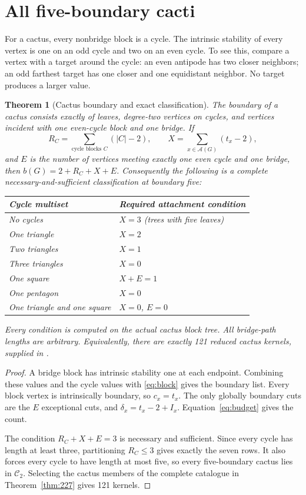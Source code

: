 \documentclass[11pt,a4paper]{article}
\newtheorem{theorem}{Theorem}[section]
\theoremstyle{definition}\newtheorem{definition}[theorem]{Definition}
\theoremstyle{remark}\newtheorem{remark}[theorem]{Remark}
\newcommand{\cuts}{\mathcal A}
\begin{document}
\section{All five-boundary cacti}
For a cactus, every nonbridge block is a cycle. The intrinsic stability of every
vertex is one on an odd cycle and two on an even cycle. To see this, compare a
vertex with a target around the cycle: an even antipode has two closer
neighbors; an odd farthest target has one closer and one equidistant neighbor.
No target produces a larger value.

\begin{theorem}[Cactus boundary and exact classification]\label{thm:cactus}
The boundary of a cactus consists exactly of leaves, degree-two vertices on
cycles, and vertices incident with one even-cycle block and one bridge.
If
\[
 R_C=\sum_{\text{cycle blocks }C}(|C|-2),\qquad
 X=\sum_{x\in\cuts(G)}(t_x-2),
\]
and $E$ is the number of vertices meeting exactly one even cycle and one bridge,
then $b(G)=2+R_C+X+E$. Consequently the following is a complete
necessary-and-sufficient classification at boundary five:
\begin{center}
\begin{tabular}{@{}ll@{}}\toprule
Cycle multiset & Required attachment condition\\\midrule
No cycles & $X=3$ (trees with five leaves)\\
One triangle & $X=2$\\
Two triangles & $X=1$\\
Three triangles & $X=0$\\
One square & $X+E=1$\\
One pentagon & $X=0$\\
One triangle and one square & $X=0$, $E=0$\\\bottomrule
\end{tabular}
\end{center}
Every condition is computed on the actual cactus block tree. All bridge-path
lengths are arbitrary. Equivalently, there are exactly 121 reduced cactus
kernels, supplied in .
\end{theorem}
\begin{proof}
A bridge block has intrinsic stability one at each endpoint. Combining these
values and the cycle values with \eqref{eq:block} gives the boundary list.
Every block vertex is intrinsically boundary, so $c_x=t_x$. The only globally
boundary cuts are the $E$ exceptional cuts, and
$\delta_x=t_x-2+I_x$. Equation~\eqref{eq:budget} gives the count.

The condition $R_C+X+E=3$ is necessary and sufficient. Since every cycle has
length at least three, partitioning $R_C\le3$ gives exactly the seven rows.
It also forces every cycle to have length at most five, so every five-boundary
cactus lies in $\mathcal C_2$. Selecting the cactus members of the complete
catalogue in Theorem~\ref{thm:227} gives 121 kernels.
\end{proof}
\end{document}
